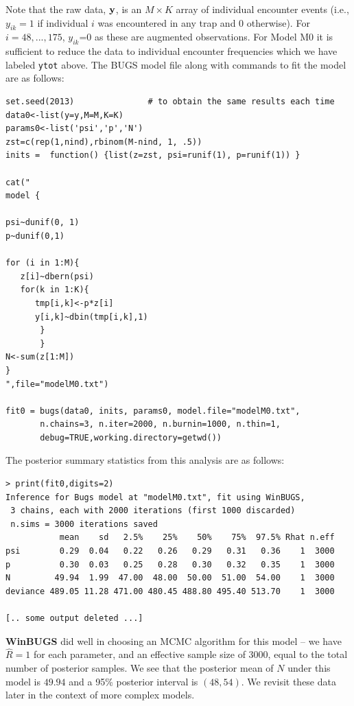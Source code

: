 Note that the raw data, ${\bf y}$, is an $M \times K$ array of
individual encounter events (i.e., $y_{ik} = 1$ if individual $i$ was
encountered in any trap and 0 otherwise).  For $i=48,...,175$,
$y_{ik}$=0 as these are augmented observations.  For Model M0 it is
sufficient to reduce the data to individual encounter frequencies
which we have labeled \mbox{\tt ytot} above.  The BUGS model file
along with commands to fit the model are as follows:

{\small
\begin{verbatim}
set.seed(2013)               # to obtain the same results each time
data0<-list(y=y,M=M,K=K)
params0<-list('psi','p','N')
zst=c(rep(1,nind),rbinom(M-nind, 1, .5))
inits =  function() {list(z=zst, psi=runif(1), p=runif(1)) }

cat("
model {

psi~dunif(0, 1)
p~dunif(0,1)

for (i in 1:M){
   z[i]~dbern(psi)
   for(k in 1:K){
      tmp[i,k]<-p*z[i]
      y[i,k]~dbin(tmp[i,k],1)
       }
       }
N<-sum(z[1:M])
}
",file="modelM0.txt")

fit0 = bugs(data0, inits, params0, model.file="modelM0.txt",
       n.chains=3, n.iter=2000, n.burnin=1000, n.thin=1,
       debug=TRUE,working.directory=getwd())
\end{verbatim}
}

The posterior
 summary statistics from this analysis are as follows:
{\small
\begin{verbatim}
> print(fit0,digits=2)
Inference for Bugs model at "modelM0.txt", fit using WinBUGS,
 3 chains, each with 2000 iterations (first 1000 discarded)
 n.sims = 3000 iterations saved
           mean    sd   2.5%    25%    50%    75%  97.5% Rhat n.eff
psi        0.29  0.04   0.22   0.26   0.29   0.31   0.36    1  3000
p          0.30  0.03   0.25   0.28   0.30   0.32   0.35    1  3000
N         49.94  1.99  47.00  48.00  50.00  51.00  54.00    1  3000
deviance 489.05 11.28 471.00 480.45 488.80 495.40 513.70    1  3000

[.. some output deleted ...]
\end{verbatim}
}
{\bf WinBUGS} did well in choosing an MCMC algorithm for this model --
we have $\hat{R} = 1$ for each parameter, and an effective sample size
of 3000, equal to the total number of posterior samples.
We see that the posterior mean of $N$ under this
model is $49.94$ and a 95\% posterior interval is $(48,54)$.  We
revisit these data later in the context of more complex models.



